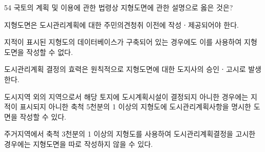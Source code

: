\begin{question}{54}
국토의 계획 및 이용에 관한 법령상 지형도면에 관한 설명으로 옳은 것은?
\begin{choices}
  \item 지형도면은 도시관리계획에 대한 주민의견청취 이전에 작성ㆍ제공되어야 한다.
  \item 지적이 표시된 지형도의 데이터베이스가 구축되어 있는 경우에도 이를 사용하여 지형도면을 작성할 수 없다.
  \item 도시관리계획 결정의 효력은 원칙적으로 지형도면에 대한 도지사의 승인ㆍ고시로 발생한다.
  \item 도시지역 외의 지역으로서 해당 토지에 도시계획시설이 결정되지 아니한 경우에는 지적이 표시되지 아니한 축척 5천분의 1 이상의 지형도에 도시관리계획사항을 명시한 도면을 작성할 수 있다.
  \item 주거지역에서 축척 3천분의 1 이상의 지형도를 사용하여 도시관리계획결정을 고시한 경우에는 지형도면을 따로 작성하지 않을 수 있다.
\end{choices}
\end{question}
